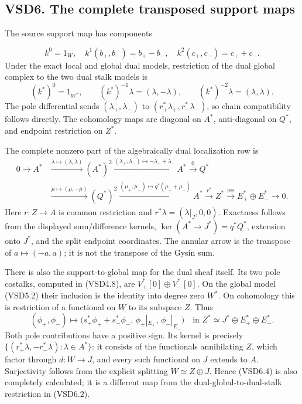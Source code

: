 \subsection{VSD6. The complete transposed support
maps}\label{vsd6.-the-complete-transposed-support-maps}

The source support map has components

\[
k^0=1_W,\quad k^1(b_+,b_-)=b_+-b_-,\quad
k^2(c_+,c_-)=c_++c_-.
\tag{VSD6.1}
\] Under the exact local and global dual models, restriction of the dual
global complex to the two dual stalk models is \[
(k^*)^0=1_{W^*},\qquad
(k^*)^{-1}\lambda=(\lambda,-\lambda),\qquad
(k^*)^{-2}\lambda=(\lambda,\lambda).
\tag{VSD6.2}
\] The pole differential sends \((\lambda_+,\lambda_-)\) to
\((r_+^*\lambda_+,r_-^*\lambda_-)\), so chain compatibility follows
directly. The cohomology maps are diagonal on \(A^*\), anti-diagonal on
\(Q^*\), and endpoint restriction on \(Z^*\).

The complete nonzero part of the algebraically dual localization row is
\[
\begin{aligned}
0\to A^*&\xrightarrow{\lambda\mapsto(\lambda,\lambda)}(A^*)^2
\xrightarrow{(\lambda_+,\lambda_-)\mapsto-\lambda_++\lambda_-}A^*
\xrightarrow{0}Q^*\\
&\xrightarrow{\mu\mapsto(\mu,-\mu)}(Q^*)^2
\xrightarrow{(\mu_+,\mu_-)\mapsto q^*(\mu_++\mu_-)}A^*
\xrightarrow{r^*}Z^*
\xrightarrow{\mathrm{res}}E_+^*\oplus E_-^*\to0 .
\end{aligned}
\tag{VSD6.3}
\] Here \(r:Z\to A\) is common restriction and
\(r^*\lambda=(\lambda|_J,0,0)\). Exactness follows from the displayed
sum/difference kernels, \(\ker(A^*\to J^*)=q^*Q^*\), extension onto
\(J^*\), and the split endpoint coordinates. The annular arrow is the
transpose of \(a\mapsto(-a,a)\); it is not the transpose of the Gysin
sum.

There is also the support-to-global map for the dual sheaf itself. Its
two pole costalks, computed in (VSD4.8), are
\(V_+^*[0]\oplus V_-^*[0]\). On the global model (VSD5.2) their
inclusion is the identity into degree zero \(W^*\). On cohomology this
is restriction of a functional on \(W\) to its subspace \(Z\). Thus \[
(\phi_+,\phi_-)\longmapsto
\bigl(s_+^*\phi_++s_-^*\phi_-,\,
\phi_+|_{E_+},\,\phi_-|_{E_-}\bigr)
\quad\text{in }Z^*\simeq J^*\oplus E_+^*\oplus E_-^*.
\tag{VSD6.4}
\] Both pole contributions have a positive sign. Its kernel is precisely
\(\{(r_+^*\lambda,-r_-^*\lambda):\lambda\in A^*\}\): it consists of the
functionals annihilating \(Z\), which factor through \(d:W\to J\), and
every such functional on \(J\) extends to \(A\). Surjectivity follows
from the explicit splitting \(W\simeq Z\oplus J\). Hence (VSD6.4) is
also completely calculated; it is a different map from the
dual-global-to-dual-stalk restriction in (VSD6.2).


